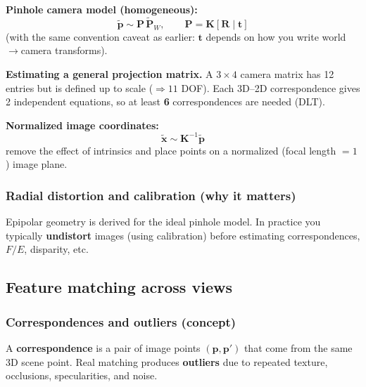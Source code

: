\documentclass[11pt,a4paper]{article}
\newcommand{\vct}[1]{\bm{#1}}
\newcommand{\mat}[1]{\mathbf{#1}}
\begin{document}
\begin{mathrule}
\textbf{Pinhole camera model (homogeneous):}\quad
\[
\tilde{\vct{p}} \sim \mat{P}\,\tilde{\vct{P}}_W,
\qquad
\mat{P}=\mat{K}[\mat{R}\mid \vct{t}]
\]
(with the same convention caveat as earlier: $\vct{t}$ depends on how you write world$\rightarrow$camera transforms).
\end{mathrule}

\begin{notebox}
\textbf{Estimating a general projection matrix.} A $3\times 4$ camera matrix has 12 entries but is defined up to scale ($\Rightarrow 11$ DOF).
Each 3D--2D correspondence gives 2 independent equations, so at least \textbf{6} correspondences are needed (DLT).
\end{notebox}

\begin{defbox}
\textbf{Normalized image coordinates:}\quad
\[
\tilde{\vct{x}} \sim \mat{K}^{-1}\tilde{\vct{p}}
\]
remove the effect of intrinsics and place points on a normalized (focal length $=1$) image plane.
\end{defbox}

\subsubsection{Radial distortion and calibration (why it matters)}

\begin{notebox}
Epipolar geometry is derived for the ideal pinhole model.
In practice you typically \textbf{undistort} images (using calibration) before estimating correspondences, $F/E$, disparity, etc.
\end{notebox}

\subsection{Feature matching across views}

\subsubsection{Correspondences and outliers (concept)}

\begin{defbox}
A \textbf{correspondence} is a pair of image points $(\vct{p},\vct{p}')$ that come from the same 3D scene point.
Real matching produces \textbf{outliers} due to repeated texture, occlusions, specularities, and noise.
\end{defbox}
\end{document}
